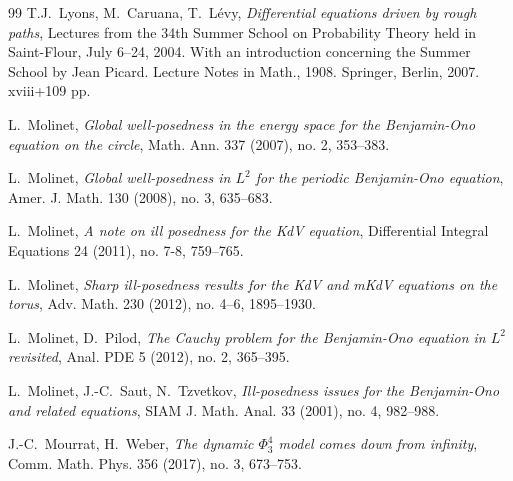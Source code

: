 \documentclass[letterpaper, 11pt,  reqno]{amsart}
\newcommand{\1}{\hspace{0.5mm}\text{I}\hspace{0.5mm}}
\numberwithin{equation}{section}
\numberwithin{theorem}{section}
\begin{document}
\begin{thebibliography}{99}
T.J.~Lyons, M.~Caruana, T.~L{\'e}vy,
{\it Differential equations driven by rough paths},
Lectures from the 34th Summer School on Probability Theory held in Saint-Flour, 
July 6--24, 2004. 
With an introduction concerning the Summer School by Jean Picard.
Lecture Notes in Math., 1908.
 Springer, Berlin, 2007. xviii+109 pp.


%
%
%


%
%
%
%



%
%



L.~Molinet, 
{\it Global well-posedness in the energy space for the Benjamin-Ono equation on the circle},
Math. Ann. 337 (2007), no. 2, 353--383. 


L.~Molinet, 
{\it Global well-posedness in $L^2$ for the periodic Benjamin-Ono equation}, 
Amer. J. Math. 130 (2008), no. 3, 635--683. 



L.~Molinet,
{\it A note on ill posedness for the KdV equation},
Differential Integral Equations 24 (2011), no. 7-8, 759--765.





L.~Molinet,
{\it Sharp ill-posedness results for the KdV and mKdV equations on the torus},
Adv. Math. 230 (2012), no. 4--6, 1895--1930.




L.~Molinet, D.~Pilod, 
{\it The Cauchy problem for the Benjamin-Ono equation in $L^2$ revisited},
 Anal. PDE 5 (2012), no. 2, 365--395. 



L.~Molinet, J.-C.~Saut, N.~Tzvetkov, 
{\it Ill-posedness issues for the Benjamin-Ono and related equations},
SIAM J. Math. Anal. 33 (2001), no. 4, 982--988. 




J.-C.~Mourrat, H.~Weber,
{\it The dynamic $\Phi^4_3$ model comes down from infinity}, 
Comm. Math. Phys. 356 (2017), no. 3, 673--753.




\end{thebibliography}
\end{document}
